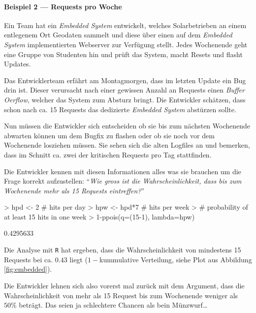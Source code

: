 \paragraph{Beispiel 2 --- Requests pro Woche}
Ein Team hat ein \emph{Embedded System} entwickelt, welches
Solarbetrieben an einem entlegenem Ort Geodaten sammelt und diese
über einen auf dem \emph{Embedded System} implementierten Webserver
zur Verfügung stellt. Jedes Wochenende geht eine Gruppe von 
Studenten hin und prüft das System, macht Resets und flasht Updates.

Das Entwicklerteam erfährt am Montagmorgen, dass im letzten Update
ein Bug drin ist. Dieser verursacht nach einer gewissen Anzahl
an Requests einen \emph{Buffer Oerflow}, welcher das System 
zum Absturz bringt. Die Entwickler schätzen, dass schon nach ca. 15 
Requests das dedizierte \emph{Embedded System} abstürzen sollte.

Nun müssen die Entwickler sich entscheiden ob sie bis zum nächsten
Wochenende abwarten können um dem Bugfix zu flashen oder ob sie
noch vor dem Wochenende losziehen müssen. Sie sehen sich die alten
Logfiles an und bemerken, dass im Schnitt ca. zwei der kritischen
Requests pro Tag stattfinden.

Die Entwickler kennen mit diesen Informationen alles was sie
brauchen um die Frage korrekt aufzustellen: "`\emph{Wie gross
ist die Wahrscheinlichkeit, dass bis zum Wochenende mehr als 
15 Requests eintreffen?}"'

\begin{Schunk}
\begin{Sinput}
> hpd <- 2 # hits per day
> hpw <- hpd*7 # hits per week
> # probability of at least 15 hits in one week
> 1-ppois(q=(15-1), lambda=hpw)
\end{Sinput}
\begin{Soutput}
[1] 0.4295633
\end{Soutput}
\end{Schunk}



Die Analyse mit \lstinline{R} hat ergeben, dass die 
Wahrscheinlichkeit von mindestens 15 Requests bei ca. $0.43$ liegt
($1-$kummulative Verteilung, siehe Plot aus Abbildung \ref{fig:embedded}).

Die Entwickler lehnen sich also vorerst mal zurück mit dem Argument,
dass die Wahrscheinlichkeit von mehr als 15 Request bis zum 
Wochenende weniger als $50\%$ beträgt. Das seien ja schlechtere Chancen
als bein Münzwurf\dots


